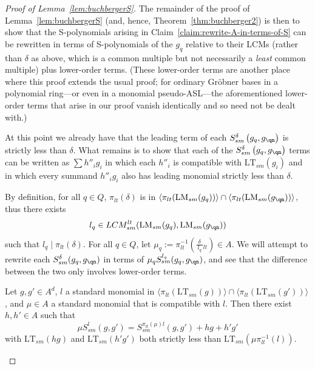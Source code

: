 \documentclass[11pt,reqno]{amsart}
\newcommand{\ltfrac}[2]{\frac{\,#1\,}{\,#2\,}{}_{{\scriptscriptstyle lt}}}
\newcommand{\divides}{\mid}
\newcommand{\lmsm}{\text{LM}_{sm}}
\newcommand{\ltsm}{\text{LT}_{sm}}
\newcommand{\lcmlt}{LCM_{sm}^{lt}}
\newcommand{\Ssm}{S_{sm}}
\newcommand{\piltd}{\pi_{lt}}
\theoremstyle{definition}
\numberwithin{equation}{section}
\begin{document}
\begin{proof}[Proof of Lemma~\ref{lem:buchbergerS}]
The remainder of the proof of Lemma~\ref{lem:buchbergerS} (and, hence, Theorem~\ref{thm:buchberger2}) is then to show that the S-polynomials arising in Claim~\ref{claim:rewrite-A-in-terms-of-S} can be rewritten in terms of S-polynomials of the $g_q$ relative to their LCMs (rather than $\delta$ as above, which is a common multiple but not necessarily a \emph{least} common multiple) plus lower-order terms. (These lower-order terms are another place where this proof extends the usual proof; for ordinary Gröbner bases in a polynomial ring---or even in a monomial pseudo-ASL---the aforementioned lower-order terms that arise in our proof vanish identically and so need not be dealt with.)

At this point we already have that the leading term of each $\Ssm^\delta\left(g_{q}, g_{\qn}\right)$ is strictly less than $\delta$. What remains is to show that each of the $\Ssm^\delta\left(g_{q}, g_{\qn}\right)$ terms can be written as $\sum h''_i g_i$ in which each $h''_i$ is compatible with $\ltsm(g_i)$ and in which every summand $h''_i g_i$ also has leading monomial strictly less than $\delta$.

By definition, for all $q \in Q$, $\piltd(\delta)$ is in $\langle \piltd(\lmsm(g_q)) \rangle \cap \langle \piltd(\lmsm(g_{\qn})) \rangle$, thus there exists 
\[
l_q \in \lcmlt(\lmsm(g_q), \lmsm(g_{\qn}))
\]
such that $l_q \divides \piltd(\delta)$. For all $q \in Q$, let $\mu_q := \pi_{lt}^{-1}\left(\ltfrac{\delta}{l_q}\right) \in A$. We will attempt to rewrite each $\Ssm^\delta( g_q,  g_{\qn})$ in terms of $\mu_q \Ssm^{l_q}(g_q, g_{\qn})$, and see that the difference between the two only involves lower-order terms.

\begin{lemma} \label{lem:Ssm-prod}
Let $g,g' \in A^d$, $l$ a standard monomial in $\langle\piltd(\ltsm(g))\rangle \cap \langle \piltd(\ltsm(g'))\rangle$, and $\mu \in A$ a standard monomial that is compatible with $l$. Then there exist $h,h' \in A$ such that
\[
\mu \Ssm^{l}(g,g') = \Ssm^{\pi_{lt}(\mu) l}(g,g') + hg + h'g'
\]
with $\ltsm(hg)$ and $\ltsm(h'g')$ both strictly less than $\ltsm(\mu \pi_{lt}^{-1}(l))$.
\end{lemma}


\end{proof}
\end{document}

